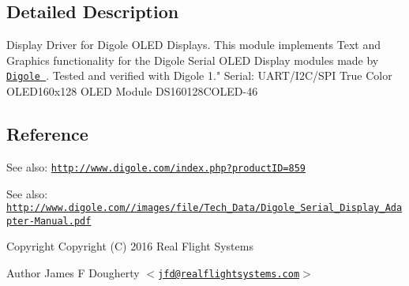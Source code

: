 \subsection{\-Detailed \-Description}
\-Display \-Driver for \-Digole \-O\-L\-E\-D \-Displays. \-This module implements \-Text and \-Graphics functionality for the \-Digole \-Serial \-O\-L\-E\-D \-Display modules made by \href{http://www.digole.com/}{\tt \-Digole }. \-Tested and verified with \-Digole 1." \-Serial\-: \-U\-A\-R\-T/\-I2\-C/\-S\-P\-I \-True \-Color \-O\-L\-E\-D160x128 \-O\-L\-E\-D \-Module \-D\-S160128\-C\-O\-L\-E\-D-\/46\hypertarget{index_ref}{}\subsection{\-Reference}\label{index_ref}
\-See also\-: \href{http://www.digole.com/index.php?productID=859}{\tt http\-://www.\-digole.\-com/index.\-php?product\-I\-D=859} 

\-See also\-: \href{http://www.digole.com//images/file/Tech_Data/Digole_Serial_Display_Adapter-Manual.pdf}{\tt http\-://www.\-digole.\-com//images/file/\-Tech\-\_\-\-Data/\-Digole\-\_\-\-Serial\-\_\-\-Display\-\_\-\-Adapter-\/\-Manual.\-pdf}

\begin{DoxyCopyright}{\-Copyright}
\-Copyright (\-C) 2016 \-Real \-Flight \-Systems 
\end{DoxyCopyright}
\begin{DoxyAuthor}{\-Author}
\-James \-F \-Dougherty $<$\href{mailto:jfd@realflightsystems.com}{\tt jfd@realflightsystems.\-com}$>$ 
\end{DoxyAuthor}


